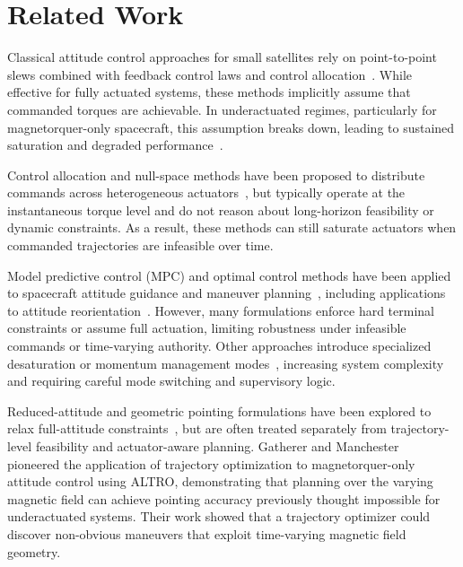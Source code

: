 \documentclass[conference]{IEEEtran}
\begin{document}
\section{Related Work}\label{sec:related_work}

Classical attitude control approaches for small satellites rely on point-to-point slews combined with feedback control laws and control allocation~\cite{wertz1978spacecraft,wie2008spacecraft}. While effective for fully actuated systems, these methods implicitly assume that commanded torques are achievable. In underactuated regimes, particularly for magnetorquer-only spacecraft, this assumption breaks down, leading to sustained saturation and degraded performance~\cite{psiaki2001magnetic,markley2003magnetic}.

Control allocation and null-space methods have been proposed to distribute commands across heterogeneous actuators~\cite{bodson2002evaluation}, but typically operate at the instantaneous torque level and do not reason about long-horizon feasibility or dynamic constraints. As a result, these methods can still saturate actuators when commanded trajectories are infeasible over time.

Model predictive control (MPC) and optimal control methods have been applied to spacecraft attitude guidance and maneuver planning~\cite{bemporad1999control,mayne2000constrained}, including applications to attitude reorientation~\cite{liu2012spacecraft}. However, many formulations enforce hard terminal constraints or assume full actuation, limiting robustness under infeasible commands or time-varying authority. Other approaches introduce specialized desaturation or momentum management modes~\cite{wertz1978spacecraft}, increasing system complexity and requiring careful mode switching and supervisory logic.

Reduced-attitude and geometric pointing formulations have been explored to relax full-attitude constraints~\cite{markley1999attitude,schlanbusch2012attitude}, but are often treated separately from trajectory-level feasibility and actuator-aware planning. Gatherer and Manchester~\cite{gatherer_magnetorquer-only_2019} pioneered the application of trajectory optimization to magnetorquer-only attitude control using ALTRO, demonstrating that planning over the varying magnetic field can achieve pointing accuracy previously thought impossible for underactuated systems. Their work showed that a trajectory optimizer could discover non-obvious maneuvers that exploit time-varying magnetic field geometry.
\end{document}
